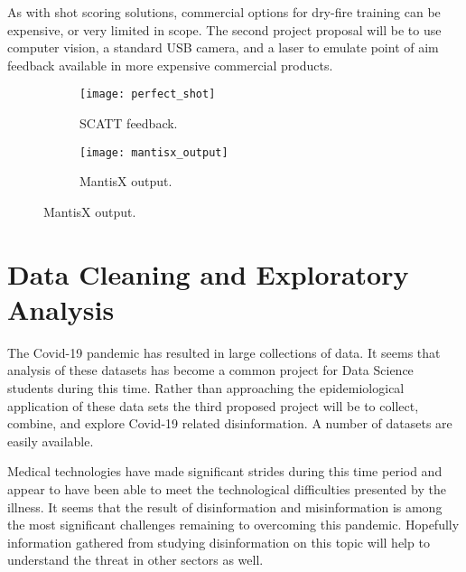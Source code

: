 \documentclass[]{article}
\begin{document}
As with shot scoring solutions, commercial options for dry-fire training can be expensive, or very limited in scope.
The second project proposal will be to use computer vision, a standard USB camera, and a laser to emulate point of aim feedback available in more expensive 
\cite{scatt} commercial products.

\begin{figure}[h]
	\begin{subfigure}{.5\textwidth}
		\centering
		\texttt{[image: perfect\_shot]}
		\caption{SCATT \cite{scatt} feedback.}
	\end{subfigure}
	\begin{subfigure}{.5\textwidth}
		\centering
		\texttt{[image: mantisx\_output]}
		\caption{MantisX output.}
	\end{subfigure}
\end{figure}


\section{Data Cleaning and Exploratory Analysis}

The Covid-19 pandemic has resulted in large collections of data.
It seems that analysis of these datasets has become a common project for Data Science students during this time.
Rather than approaching the epidemiological application of these data sets the third proposed project will be to collect, combine, and explore Covid-19 related disinformation.
A number of datasets are easily available.
\cite{Shapiro2021}

Medical technologies have made significant strides during this time period and appear to have been able to meet the technological difficulties presented by the illness.
It seems that the result of disinformation and misinformation is among the most significant challenges remaining to overcoming this pandemic.
Hopefully information gathered from studying disinformation on this topic will help to understand the threat in other sectors as well.



\clearpage


\end{document}
